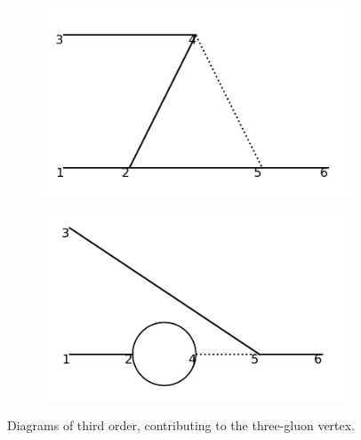 \documentclass[11pt,a4paper,twoside,pdf]{article}
\numberwithin{equation}{section}
\begin{document}
\begin{figure}[h!]
\begin{subfigure}[t]{0.24\textwidth}
        \caption{ }
        \label{fig:order3_1to2/6}
    \end{subfigure}
    \hfill
    \begin{subfigure}[t]{0.24\textwidth}
        \centering
        \includegraphics[width=\textwidth]{plots/order3/order3_1to2/7.png}
        \caption{ }
    \end{subfigure}
    \hfill 
    \begin{subfigure}[t]{0.24\textwidth}
        \centering
        \includegraphics[width=\textwidth]{plots/order3/order3_1to2/8.png}
        \caption{ }
    \end{subfigure}
    \caption{Diagrams of third order, contributing to the three-gluon vertex.}
    \label{fig:order3_1to2}
\end{figure}
\end{document}
